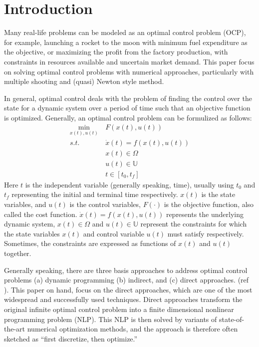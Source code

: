 \documentclass  [
  paper    = a4,
  BCOR     = 10mm,
  twoside,
  fontsize = 12pt,
  fleqn,
  toc      = bibnumbered,
  toc      = listofnumbered,
  numbers  = noendperiod,
  headings = normal,
  listof   = leveldown,
  version  = 3.03
]                                       {scrreprt}
\newcommand{\<}{\langle}
\renewcommand{\>}{\rangle}
\begin{document}
   
   \tableofcontents
    \let\clearpage\relax
   \newpage
   
   
 \chapter{Introduction}  
 \label{Chapter1}
Many real-life problems can be modeled as an optimal control problem (OCP), for example, launching a rocket to the moon with minimum fuel expenditure as the objective, or maximizing the profit from the factory production, with constraints in resources available and uncertain market demand. This paper focus on solving optimal control problems with numerical approaches, particularly with multiple shooting and (quasi) Newton style method. 

In general, optimal control deals with the problem of finding the control over the state for a dynamic system over a period of time such that an objective function is optimized. Generally, an optimal control problem can be formulized as follows: 
      \begin{equation}
   	\begin{aligned}
   	\underset{x(t), u(t)}{\text{min}}  \ &  F(x(t), u(t)) \\
   		s.t.\ \  &  \dot{x} (t) = f(x(t), u(t))\\ 
   		        & x(t) \in \Omega \\
   		          & u(t) \in \mathbb{U}  \\
   		          & t \in [t_0, t_f]
   	\end{aligned}
   	\label{P1_OPH}
   \end{equation}
 Here $t$ is the independent variable (generally speaking, time), usually using $t_0$ and $t_f$ representing the initial and terminal time respectively. $x(t)$ is the state variables, and $u(t)$ is the control variables, $F(\cdot)$ is the objective function, also called the cost function. $\dot{x} (t) = f(x(t), u(t))$ represents the underlying dynamic system,  $x(t) \in \Omega$ and  $ u(t) \in \mathbb{U}$ represent the constraints for which the state variables $x(t)$ and control variable $u(t)$ must satisfy respectively.  Sometimes, the constraints are expressed as functions of $x(t)$ and $u(t)$ together. 
 

Generally speaking, there are three basis approaches to address optimal control problems (a) dynamic programming (b) indirect, and (c) direct approaches. (ref \cite{MHHP05}). This paper on hand, focus on the direct approaches, which are one of the most widespread and successfully used techniques. Direct approaches transform the original infinite optimal control problem into a finite dimensional nonlinear programming problem (NLP). This NLP is then solved by variants of state-of-the-art numerical optimization methods, and the approach is therefore often sketched as “first discretize, then optimize.” 
\end{document}
